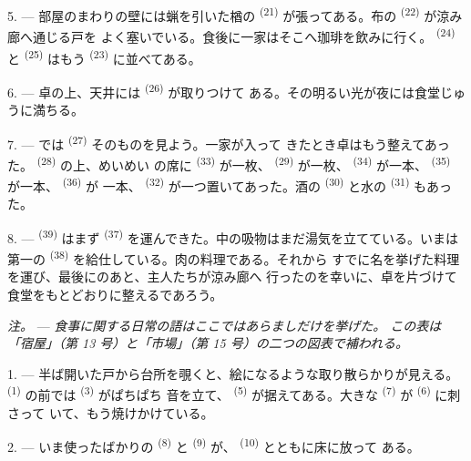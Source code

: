 \VUsaut{4.6mm}
\VUsaut{3.0mm}

5. --- 部屋のまわりの壁には蝋を引いた楢の \textsuperscript{(21)}
が張ってある。布の \textsuperscript{(22)} が涼み廊へ通じる戸を
よく塞いでいる。食後に一家はそこへ珈琲を飲みに行く。
\textsuperscript{(24)} と \textsuperscript{(25)} はもう
\textsuperscript{(23)} に並べてある。

6. --- 卓の上、天井には \textsuperscript{(26)} が取りつけて
ある。その明るい光が夜には食堂じゅうに満ちる。

7. --- では \textsuperscript{(27)} そのものを見よう。一家が入って
きたとき卓はもう整えてあった。 \textsuperscript{(28)} の上、めいめい
の席に \textsuperscript{(33)} が一枚、
\textsuperscript{(29)} が一枚、 \textsuperscript{(34)} が一本、
 \textsuperscript{(35)} が一本、 \textsuperscript{(36)} が
一本、 \textsuperscript{(32)} が一つ置いてあった。酒の
\textsuperscript{(30)} と水の \textsuperscript{(31)} もあった。

8. ---  \textsuperscript{(39)} はまず
\textsuperscript{(37)} を運んできた。中の吸物はまだ湯気を立てている。いまは第一の
 \textsuperscript{(38)} を給仕している。肉の料理である。それから
すでに名を挙げた料理を運び、最後にのあと、主人たちが涼み廊へ
行ったのを幸いに、卓を片づけて食堂をもとどおりに整えるであろう。

\textit{注。} --- \textit{食事に関する日常の語はここではあらましだけを挙げた。
この表は「宿屋」（第 13 号）と「市場」（第 15 号）の二つの図表で補われる。}

\VUsaut{4.6mm}
\VUsaut{3.0mm}

1. --- 半ば開いた戸から台所を覗くと、絵になるような取り散らかりが見える。
 \textsuperscript{(1)} の前では \textsuperscript{(3)} がぱちぱち
音を立て、 \textsuperscript{(5)} が据えてある。大きな
 \textsuperscript{(7)} が \textsuperscript{(6)} に刺さって
いて、もう焼けかけている。

2. --- いま使ったばかりの \textsuperscript{(8)} と
\textsuperscript{(9)} が、 \textsuperscript{(10)} とともに床に放って
ある。

